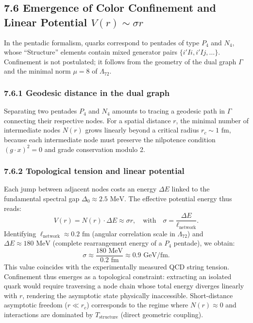 \documentclass[11pt]{article}
\begin{document}
\hypertarget{emergence-of-color-confinement-and-linear-potential-vr-sim-sigma-r}{%
\subsection{\texorpdfstring{7.6 Emergence of Color Confinement and
Linear Potential
\(V(r) \sim \sigma r\)}{7.6 Emergence of Color Confinement and Linear Potential V(r) \textbackslash sim \textbackslash sigma r}}\label{emergence-of-color-confinement-and-linear-potential-vr-sim-sigma-r}}

In the pentadic formalism, quarks correspond to pentades of type \(P_4\)
and \(N_4\), whose ``Structure'' elements contain mixed generator pairs
\(\{i'Ii, i'Ij, \dots\}\). Confinement is not postulated; it follows
from the geometry of the dual graph \(\Gamma\) and the minimal norm
\(\mu=8\) of \(\Lambda_{72}\).

\hypertarget{geodesic-distance-in-the-dual-graph}{%
\subsubsection{7.6.1 Geodesic distance in the dual
graph}\label{geodesic-distance-in-the-dual-graph}}

Separating two pentades \(P_4\) and \(N_4\) amounts to tracing a
geodesic path in \(\Gamma\) connecting their respective nodes. For a
spatial distance \(r\), the minimal number of intermediate nodes
\(N(r)\) grows linearly beyond a critical radius
\(r_c \sim 1 \text{ fm}\), because each intermediate node must preserve
the nilpotence condition \((g\cdot x)^2=0\) and grade conservation
modulo 2.

\hypertarget{topological-tension-and-linear-potential}{%
\subsubsection{7.6.2 Topological tension and linear
potential}\label{topological-tension-and-linear-potential}}

Each jump between adjacent nodes costs an energy \(\Delta E\) linked to
the fundamental spectral gap \(\Delta_0 \approx 2.5 \text{ MeV}\). The
effective potential energy thus reads: \[
V(r) = N(r) \cdot \Delta E \approx \sigma r, \quad \text{with} \quad \sigma = \frac{\Delta E}{\ell_{\text{network}}}.
\] Identifying \(\ell_{\text{network}} \approx 0.2 \text{ fm}\) (angular
correlation scale in \(\Lambda_{72}\)) and
\(\Delta E \approx 180 \text{ MeV}\) (complete rearrangement energy of a
\(P_4\) pentade), we obtain: \[
\sigma \approx \frac{180 \text{ MeV}}{0.2 \text{ fm}} \approx 0.9 \text{ GeV/fm}.
\] This value coincides with the experimentally measured QCD string
tension. Confinement thus emerges as a topological constraint:
extracting an isolated quark would require traversing a node chain whose
total energy diverges linearly with \(r\), rendering the asymptotic
state physically inaccessible. Short-distance asymptotic freedom
(\(r \ll r_c\)) corresponds to the regime where \(N(r) \approx 0\) and
interactions are dominated by \(T_{\text{structure}}\) (direct geometric
coupling).
\end{document}
